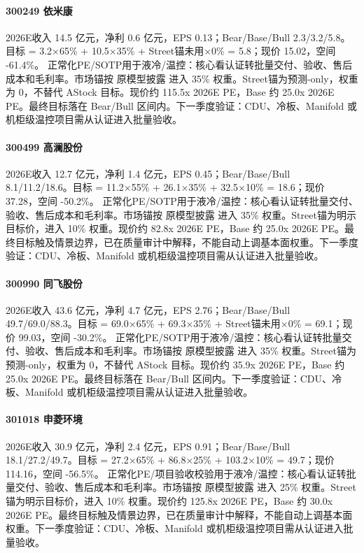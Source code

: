 \paragraph{300249 依米康} 2026E收入 14.5 亿元，净利 0.6 亿元，EPS 0.13；Bear/Base/Bull 2.3/3.2/5.8。目标 = 3.2×65\% + 10.5×35\% + Street锚未用×0\% = 5.8；现价 15.02，空间 -61.4\%。 正常化PE/SOTP用于液冷/温控：核心看认证转批量交付、验收、售后成本和毛利率。市场锚按 原模型披露 进入 35\% 权重。Street锚为预测-only，权重为 0，不替代 AStock 目标。现价约 115.5x 2026E PE，Base 约 25.0x 2026E PE。最终目标落在 Bear/Bull 区间内。下一季度验证：CDU、冷板、Manifold 或机柜级温控项目需从认证进入批量验收。
\paragraph{300499 高澜股份} 2026E收入 12.7 亿元，净利 1.4 亿元，EPS 0.45；Bear/Base/Bull 8.1/11.2/18.6。目标 = 11.2×55\% + 26.1×35\% + 32.5×10\% = 18.6；现价 37.28，空间 -50.2\%。 正常化PE/SOTP用于液冷/温控：核心看认证转批量交付、验收、售后成本和毛利率。市场锚按 原模型披露 进入 35\% 权重。Street锚为明示目标价，进入 10\% 权重。现价约 82.8x 2026E PE，Base 约 25.0x 2026E PE。最终目标触及情景边界，已在质量审计中解释，不能自动上调基本面权重。下一季度验证：CDU、冷板、Manifold 或机柜级温控项目需从认证进入批量验收。
\paragraph{300990 同飞股份} 2026E收入 43.6 亿元，净利 4.7 亿元，EPS 2.76；Bear/Base/Bull 49.7/69.0/88.3。目标 = 69.0×65\% + 69.3×35\% + Street锚未用×0\% = 69.1；现价 99.03，空间 -30.2\%。 正常化PE/SOTP用于液冷/温控：核心看认证转批量交付、验收、售后成本和毛利率。市场锚按 原模型披露 进入 35\% 权重。Street锚为预测-only，权重为 0，不替代 AStock 目标。现价约 35.9x 2026E PE，Base 约 25.0x 2026E PE。最终目标落在 Bear/Bull 区间内。下一季度验证：CDU、冷板、Manifold 或机柜级温控项目需从认证进入批量验收。
\paragraph{301018 申菱环境} 2026E收入 30.9 亿元，净利 2.4 亿元，EPS 0.91；Bear/Base/Bull 18.1/27.2/49.7。目标 = 27.2×65\% + 86.8×25\% + 103.2×10\% = 49.7；现价 114.16，空间 -56.5\%。 正常化PE/项目验收校验用于液冷/温控：核心看认证转批量交付、验收、售后成本和毛利率。市场锚按 原模型披露 进入 25\% 权重。Street锚为明示目标价，进入 10\% 权重。现价约 125.8x 2026E PE，Base 约 30.0x 2026E PE。最终目标触及情景边界，已在质量审计中解释，不能自动上调基本面权重。下一季度验证：CDU、冷板、Manifold 或机柜级温控项目需从认证进入批量验收。
